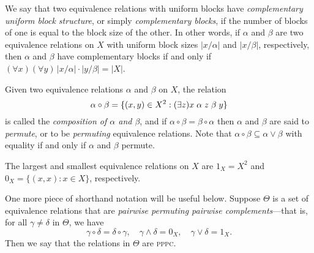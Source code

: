 \documentclass{amsart}
\theoremstyle{plain}
\theoremstyle{definition}
\theoremstyle{definition}
\numberwithin{equation}{section}
\newcommand{\<}{\ensuremath{\langle}}
\renewcommand{\>}{\ensuremath{\rangle}}
\newcommand{\Eq}{\ensuremath{\operatorname{Eq}}}
\newcommand{\rel}{\ensuremath{\mathrel}}
\newcommand{\PPPC}{\textsc{pppc}\xspace}
\newcommand{\meet}{\ensuremath{\wedge}}
\newcommand{\join}{\ensuremath{\vee}}
\begin{document}
We say that two equivalence relations with uniform
blocks  have 
\emph{complementary uniform block structure}, or simply \emph{complementary
  blocks}, if the number of blocks of one is equal to
the block size of the other. In other words, if $\alpha$ and $\beta$ are two
equivalence relations on $X$ with uniform block sizes $|x/\alpha|$ and
$|x/\beta|$, respectively, then $\alpha$ and $\beta$ have complementary blocks
if and only if $(\forall x)(\forall y)\, |x/\alpha|\cdot |y/\beta| = |X|$.


Given two equivalence relations $\alpha$ and $\beta$ on $X$, the relation
\[
\alpha \circ \beta = \{(x,y) \in X^2: (\exists z)x\rel{\alpha} z
\rel{\beta} y\}
\]
is called the \emph{composition of $\alpha$ and $\beta$}, and if 
$\alpha \circ \beta = \beta \circ \alpha$ then $\alpha$ and $\beta$ are said to
\emph{permute}, or to be \emph{permuting} equivalence relations.  
Note that $\alpha \circ \beta \subseteq \alpha \join \beta$ with equality if and
only if $\alpha$ and $\beta$ permute.

The largest and smallest equivalence relations on $X$ are $1_X = X^2$
and $0_X = \{(x,x) : x \in X\}$, respectively.

One more piece of shorthand notation will be useful below.  
Suppose $\Theta$ is a set of equivalence relations that are 
\emph{pairwise permuting pairwise complements}---that is, 
for all $\gamma \neq \delta$ in $\Theta$, we have
\[
\gamma \circ \delta = \delta \circ \gamma,  
\quad  \gamma \meet \delta = 0_X, 
\quad  \gamma \join \delta = 1_X.
\]
Then we say that the relations in $\Theta$ are \PPPC.
\end{document}
